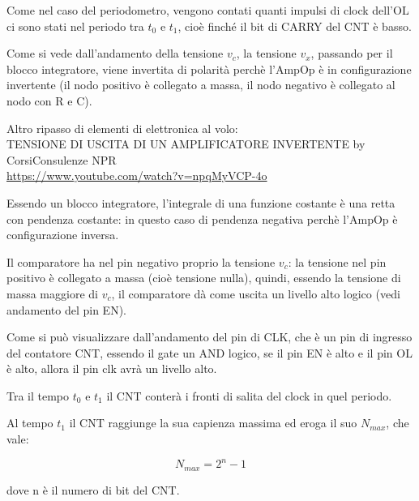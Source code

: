 Come nel caso del periodometro, vengono contati quanti impulsi di clock dell'OL ci sono stati nel periodo tra $t_0$ e $t_1$, cioè finché il bit di CARRY del CNT è basso. \newline 

Come si vede dall'andamento della tensione $v_c$, 
la tensione $v_x$, passando per il blocco integratore, viene invertita di polarità perchè l'AmpOp è in configurazione invertente (il nodo positivo è collegato a massa, il nodo negativo è collegato al nodo con R e C). \newline 

\begin{tcolorbox}
    Altro ripasso di elementi di elettronica al volo: \\
    TENSIONE DI USCITA DI UN AMPLIFICATORE INVERTENTE by CorsiConsulenze NPR \\
    \url{https://www.youtube.com/watch?v=npqMyVCP-4o}
\end{tcolorbox}

Essendo un blocco integratore, l'integrale di una funzione costante è una retta con pendenza costante: 
in questo caso di pendenza negativa perchè l'AmpOp è configurazione inversa. \newline 

Il comparatore ha nel pin negativo proprio la tensione $v_c$: 
la tensione nel pin positivo è collegato a massa (cioè tensione nulla), quindi, essendo la tensione di massa maggiore di $v_c$, 
il comparatore dà come uscita un livello alto logico (vedi andamento del pin EN). \newline 

Come si può visualizzare dall'andamento del pin di CLK, che è un pin di ingresso del contatore CNT, 
essendo il gate un AND logico, se il pin EN è alto e il pin OL è alto, allora il pin clk avrà un livello alto. \newline  

Tra il tempo $t_0$ e $t_1$ il CNT conterà i fronti di salita del clock in quel periodo. \newline 

Al tempo $t_1$ il CNT raggiunge la sua capienza massima ed eroga il suo $N_{max}$, che vale: 

{
    \Large 
    \begin{equation}
        N_{max} = 2^{n} - 1
    \end{equation}
}

dove n è il numero di bit del CNT. \newline 

